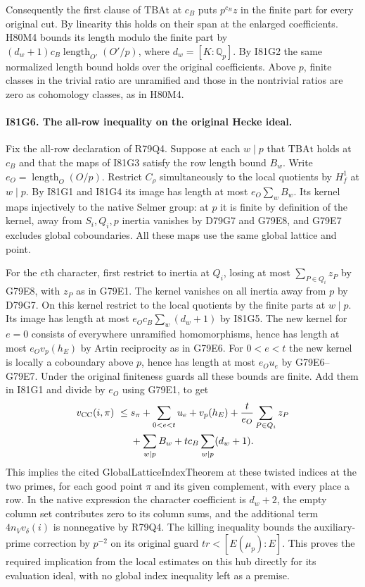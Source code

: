Consequently the first clause of $\mathrm{TBAt}$ at $c_B$ puts
$p^{c_B} z$ in the finite part for every original cut. By linearity
this holds on their span at the enlarged coefficients.
H80M4 bounds its length modulo the finite part by
$(d_w+1)c_B\operatorname{length}_{O'}(O'/p)$,
where $d_w=[K:\mathbb Q_p]$. By I81G2 the same normalized length
bound holds over the original coefficients. Above $p$, finite
classes in the trivial ratio are unramified and those in the
nontrivial ratios are zero as cohomology classes, as in H80M4.

\paragraph{I81G6. The all-row inequality on the original Hecke ideal.}
Fix the all-row declaration of R79Q4. Suppose at each $w\mid p$
that $\mathrm{TBAt}$ holds at $c_B$ and that the maps of I81G3
satisfy the row length bound $B_w$. Write $e_O=\operatorname{length}_O(O/p)$.
Restrict $C_\rho$ simultaneously to the local quotients by $H_f^1$
at $w\mid p$. By I81G1 and I81G4 its image has length at most
$e_O\sum_w B_w$. Its kernel maps injectively to the native Selmer
group: at $p$ it is finite by definition of the kernel, away from
$S_i,Q_i,p$ inertia vanishes by D79G7 and G79E8, and G79E7
excludes global coboundaries. All these maps use the same global
lattice and point.

For the $e$th character, first restrict to inertia at $Q_i$, losing
at most $\sum_{P\in Q_i}z_P$ by G79E8, with $z_P$ as in G79E1.
The kernel vanishes on all inertia away from $p$ by D79G7. On
this kernel restrict to the local quotients by the finite parts
at $w\mid p$. Its image has length at most
$e_O c_B\sum_w(d_w+1)$ by I81G5. The new kernel for $e=0$
consists of everywhere unramified homomorphisms, hence has length
at most $e_O v_p(h_E)$ by Artin reciprocity as in G79E6.
For $0<e<t$ the new kernel is locally a coboundary above $p$,
hence has length at most $e_O u_e$ by G79E6--G79E7.
Under the original finiteness guards all these bounds are finite.
Add them in I81G1 and divide by $e_O$ using G79E1, to get
\[
\begin{split}
 v_{\rm CC}(i,\pi)\ \le\;&
 s_\pi+\sum_{0<e<t}u_e+v_p(h_E)
       +\frac{t}{e_O}\sum_{P\in Q_i}z_P\\
 &+\sum_{w\mid p}B_w+t c_B\sum_{w\mid p}(d_w+1).
\end{split}
\]
This implies the cited $\mathrm{GlobalLatticeIndexTheorem}$ at
these twisted indices at the two primes, for each good point $\pi$
and its given complement, with every place a row. In the native expression
the character coefficient is $d_w+2$, the empty column set
contributes zero to its column sums, and the additional term
$4n_Vv_\delta(i)$ is nonnegative by R79Q4. The killing inequality
bounds the auxiliary-prime correction by $p^{-2}$ on its original
guard $tr<[E(\mu_p):E]$. This proves the required implication
from the local estimates on this hub directly for its evaluation
ideal, with no global index inequality left as a premise.
